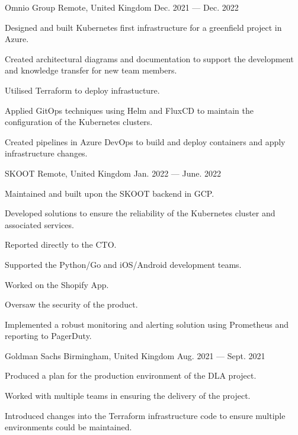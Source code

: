 \begin{cventries}
    {Omnio Group}
    {Remote, United Kingdom}
    {Dec. 2021 — Dec. 2022 }
    {
        \begin{cvitems}
        \item{Designed and built Kubernetes first infrastructure for a greenfield project in Azure.}
        \item{Created architectural diagrams and documentation to support the development and knowledge transfer for new team members.}
        \item{Utilised Terraform to deploy infrastucture.}
        \item{Applied GitOps techniques using Helm and FluxCD to maintain the configuration of the Kubernetes clusters.}
        \item{Created pipelines in Azure DevOps to build and deploy containers and apply infrastructure changes.}
        \end{cvitems}
    }

    {SKOOT}
    {Remote, United Kingdom}
    {Jan. 2022 — June. 2022}
    {
        \begin{cvitems}
        \item{Maintained and built upon the SKOOT backend in GCP.}
        \item{Developed solutions to ensure the reliability of the Kubernetes cluster and associated services.}
        \item{Reported directly to the CTO.}
        \item{Supported the Python/Go and iOS/Android development teams.}
	      \item{Worked on the Shopify App.}
        \item{Oversaw the security of the product.}
	      \item{Implemented a robust monitoring and alerting solution using Prometheus and reporting to PagerDuty.}
        \end{cvitems}
    }

    {Goldman Sachs}
    {Birmingham, United Kingdom}
    {Aug. 2021 — Sept. 2021}
    {
        \begin{cvitems}
        \item{Produced a plan for the production environment of the DLA project.}
        \item{Worked with multiple teams in ensuring the delivery of the project.}
        \item{Introduced changes into the Terraform infrastructure code to ensure multiple environments could be maintained.}
        \end{cvitems}
    }


\end{cventries}
